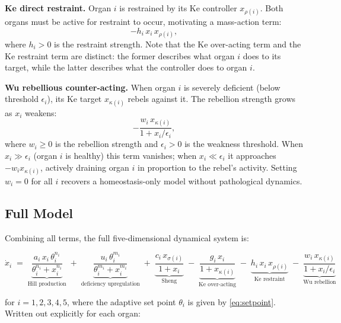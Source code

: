 \documentclass{article}
\begin{document}
\medskip
\noindent\textbf{Ke direct restraint.}
Organ $i$ is restrained by its Ke controller $x_{\rho(i)}$. Both organs must be
active for restraint to occur, motivating a mass-action term:
\[
    -h_i\, x_i\, x_{\rho(i)},
\]
where $h_i > 0$ is the restraint strength. Note that the Ke over-acting term and
the Ke restraint term are distinct: the former describes what organ $i$ does to
its target, while the latter describes what the controller does to organ $i$.

\medskip
\noindent\textbf{Wu rebellious counter-acting.}
When organ $i$ is severely deficient (below threshold $\epsilon_i$), its Ke target
$x_{\kappa(i)}$ rebels against it. The rebellion strength grows as $x_i$ weakens:
\[
    -\frac{w_i\, x_{\kappa(i)}}{1 + x_i/\epsilon_i},
\]
where $w_i \geq 0$ is the rebellion strength and $\epsilon_i > 0$ is the weakness
threshold. When $x_i \gg \epsilon_i$ (organ $i$ is healthy) this term vanishes;
when $x_i \ll \epsilon_i$ it approaches $-w_i x_{\kappa(i)}$, actively draining
organ $i$ in proportion to the rebel's activity. Setting $w_i = 0$ for all $i$
recovers a homeostasis-only model without pathological dynamics.

\subsection{Full Model}

Combining all terms, the full five-dimensional dynamical system is:

\begin{equation}\label{eq:fullmodel}
\boxed{
\dot{x}_i \;=\;
\underbrace{\frac{a_i\, x_i\, \theta_i^{n_i}}{\theta_i^{n_i} + x_i^{n_i}}}_{\text{Hill production}}
\;+\;
\underbrace{\frac{u_i\, \theta_i^{m_i}}{\theta_i^{m_i} + x_i^{m_i}}}_{\text{deficiency upregulation}}
\;+\;
\underbrace{\frac{c_i\, x_{\sigma(i)}}{1 + x_i}}_{\text{Sheng}}
\;-\;
\underbrace{\frac{g_i\, x_i}{1 + x_{\kappa(i)}}}_{\text{Ke over-acting}}
\;-\;
\underbrace{h_i\, x_i\, x_{\rho(i)}}_{\text{Ke restraint}}
\;-\;
\underbrace{\frac{w_i\, x_{\kappa(i)}}{1 + x_i/\epsilon_i}}_{\text{Wu rebellion}}
}
\end{equation}

\noindent
for $i = 1, 2, 3, 4, 5$, where the adaptive set point $\theta_i$ is given by
\eqref{eq:setpoint}. Written out explicitly for each organ:
\end{document}
